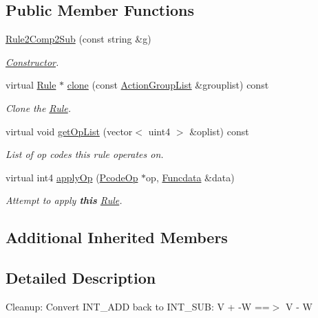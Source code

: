 \subsection*{Public Member Functions}
\begin{DoxyCompactItemize}
\item 
\mbox{\hyperlink{class_rule2_comp2_sub_ae7a733910497e960661ac751b2ad93d6}{Rule2\+Comp2\+Sub}} (const string \&g)
\begin{DoxyCompactList}\small\item\em \mbox{\hyperlink{class_constructor}{Constructor}}. \end{DoxyCompactList}\item 
virtual \mbox{\hyperlink{class_rule}{Rule}} $\ast$ \mbox{\hyperlink{class_rule2_comp2_sub_a8c99299a5ecf4ac0b670a69a451391d9}{clone}} (const \mbox{\hyperlink{class_action_group_list}{Action\+Group\+List}} \&grouplist) const
\begin{DoxyCompactList}\small\item\em Clone the \mbox{\hyperlink{class_rule}{Rule}}. \end{DoxyCompactList}\item 
virtual void \mbox{\hyperlink{class_rule2_comp2_sub_ac179137322a0b29d73b7ab377426cbfc}{get\+Op\+List}} (vector$<$ uint4 $>$ \&oplist) const
\begin{DoxyCompactList}\small\item\em List of op codes this rule operates on. \end{DoxyCompactList}\item 
virtual int4 \mbox{\hyperlink{class_rule2_comp2_sub_a016089f19466049e949fd664649c27e4}{apply\+Op}} (\mbox{\hyperlink{class_pcode_op}{Pcode\+Op}} $\ast$op, \mbox{\hyperlink{class_funcdata}{Funcdata}} \&data)
\begin{DoxyCompactList}\small\item\em Attempt to apply {\bfseries{this}} \mbox{\hyperlink{class_rule}{Rule}}. \end{DoxyCompactList}\end{DoxyCompactItemize}
\subsection*{Additional Inherited Members}


\subsection{Detailed Description}
Cleanup\+: Convert I\+N\+T\+\_\+\+A\+DD back to I\+N\+T\+\_\+\+S\+UB\+: {\ttfamily V + -\/W ==$>$ V -\/ W} 

